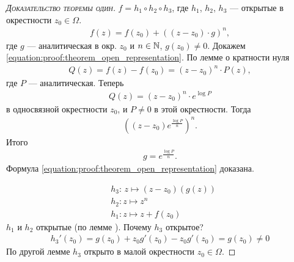 \documentclass[../../main.tex]{subfiles}
\begin{document}
\begin{proof}[\normalfont\textsc{Доказательство теоремы один}]
 $ f = h_1 \circ h_2 \circ h_3 $, где $ h_1 $, $ h_2 $, $ h_3 $ --- открытые в окрестности $ z_0 \in \Omega $.
 \begin{align}
  \label{equation:proof:theorem_open_representation}
  f(z) = f(z_0) + \left((z - z_0) \cdot g \right)^{n},
 \end{align} где $ g $ --- аналитическая в окр. $ z_0 $ и $ n \in \mathbb{N} $, $ g(z_0) \neq 0 $. Докажем \eqref{equation:proof:theorem_open_representation}. По лемме о кратности нуля
 \begin{align*}
  Q(z) = f(z) - f(z_0) = (z - z_0)^{n} \cdot P(z),
 \end{align*} где $ P $ --- аналитическая. Теперь
 \begin{align*}
  Q(z) = (z - z_0)^{n} \cdot e^{\log P}
 \end{align*} в односвязной окрестности $ z_0 $, и $ P \neq 0 $ в этой окрестности. Тогда
 \begin{align*}
  \left((z-z_0)e^{\frac{\log P}{n}}\right)^{n}.
 \end{align*} Итого
 \begin{align*}
  g = e^{\frac{\log P}{n}}.
 \end{align*} Формула \eqref{equation:proof:theorem_open_representation} доказана.

 \begin{align*}
  &h_3 \colon\, z \mapsto (z-z_0)(g(z)) \\
  &h_2 \colon z \mapsto z^{n} \\
  &h_1 \colon z \mapsto z + f(z_0)
 \end{align*} $ h_1 $ и $ h_2 $ открытые (по лемме ). Почему $ h_3 $ открытое?
 \begin{align*}
  h_3'(z_0) = g(z_0) + z_0 g'(z_0) - z_0 g'(z_0) = g(z_0) \neq 0
 \end{align*} По другой лемме $ h_3 $ открыто в малой окрестности $ z_0 \in \Omega $.

\end{proof}
\end{document}
